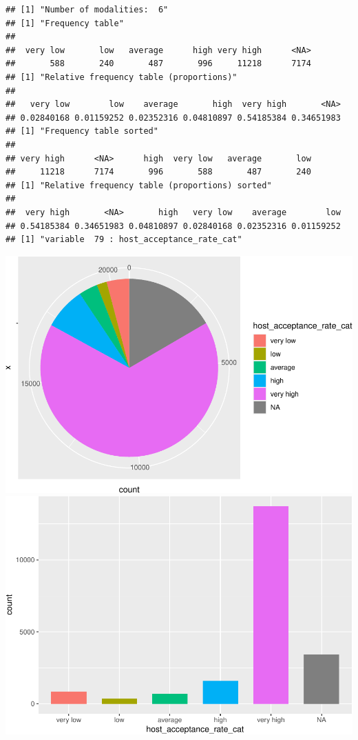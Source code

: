 \begin{verbatim}
## [1] "Number of modalities:  6"
## [1] "Frequency table"
## 
##  very low       low   average      high very high      <NA> 
##       588       240       487       996     11218      7174 
## [1] "Relative frequency table (proportions)"
## 
##   very low        low    average       high  very high       <NA> 
## 0.02840168 0.01159252 0.02352316 0.04810897 0.54185384 0.34651983 
## [1] "Frequency table sorted"
## 
## very high      <NA>      high  very low   average       low 
##     11218      7174       996       588       487       240 
## [1] "Relative frequency table (proportions) sorted"
## 
##  very high       <NA>       high   very low    average        low 
## 0.54185384 0.34651983 0.04810897 0.02840168 0.02352316 0.01159252 
## [1] "variable  79 : host_acceptance_rate_cat"
\end{verbatim}

\includegraphics{anal_files/figure-latex/unnamed-chunk-9-62.pdf}
\includegraphics{anal_files/figure-latex/unnamed-chunk-9-63.pdf}

